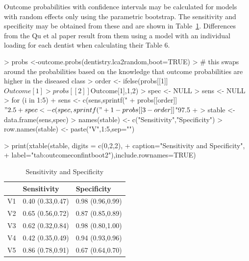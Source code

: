 Outcome probabilities with confidence intervals may be calculated for models with random effects only using the parametric bootstrap. The sensitivity and specificity may be obtained from these and are shown in Table~\ref{tab:outcomeconfintboot2}. Differences from the Qu et al paper result from them using a model with an individual loading for each dentist when calculating their Table 6.


\begin{Schunk}
\begin{Sinput}
> probs <-outcome.probs(dentistry.lca2random,boot=TRUE)
> # this swaps around the probabilities based on the knowledge that outcome probabilities are higher in the diseased class
> order <- ifelse(probs[[1]]$Outcome[1]>probs[[2]]$Outcome[1],1,2)
> spec <- NULL
> sens <- NULL
> for (i in 1:5) {
+ 	sens <- c(sens,sprintf("%
+       probs[[order]]$"2.5 %
+ 	spec <- c(spec,sprintf("%
+       1-probs[[3-order]]$"97.5 %
+ }
> stable <- data.frame(sens,spec)
> names(stable) <- c("Sensitivity","Specificity")
> row.names(stable) <- paste("V",1:5,sep="")
\end{Sinput}
\end{Schunk}


\begin{Schunk}
\begin{Sinput}
> print(xtable(stable, digits = c(0,2,2),
+ 	caption="Sensitivity and Specificity",
+ 	label="tab:outcomeconfintboot2"),include.rownames=TRUE)
\end{Sinput}
\begin{table}[ht]
\centering
\begin{tabular}{rll}
  \hline
 & Sensitivity & Specificity \\ 
  \hline
V1 & 0.40 (0.33,0.47) & 0.98 (0.96,0.99) \\ 
  V2 & 0.65 (0.56,0.72) & 0.87 (0.85,0.89) \\ 
  V3 & 0.62 (0.32,0.84) & 0.98 (0.80,1.00) \\ 
  V4 & 0.42 (0.35,0.49) & 0.94 (0.93,0.96) \\ 
  V5 & 0.86 (0.78,0.91) & 0.67 (0.64,0.70) \\ 
   \hline
\end{tabular}
\caption{Sensitivity and Specificity} 
\label{tab:outcomeconfintboot2}
\end{table}\end{Schunk}

